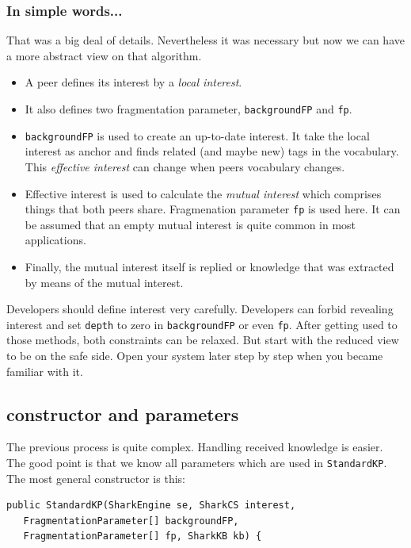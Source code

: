 {\subsubsection{In simple words...}
That was a big deal of details. Nevertheless it was necessary but now we can have a more abstract view on that algorithm.

\begin{itemize}
\item
A peer defines its interest by a {\it local interest}.
\item
It also defines two fragmentation parameter, {\tt backgroundFP} and {\tt fp}.

\item
{\tt backgroundFP} is used to create an up-to-date interest. It take the local interest as anchor and finds related (and maybe new) tags in the vocabulary. This {\it effective interest} can change when peers vocabulary changes.

\item
Effective interest is used to calculate the {\it mutual interest} which comprises things that both peers share. Fragmenation parameter {\tt fp} is used here. It can be assumed that an empty mutual interest is quite common in most applications.

\item
Finally, the mutual interest itself is replied or knowledge that was extracted by means of the mutual interest.
\end{itemize}

Developers should define interest very carefully. Developers can forbid revealing interest and set {\tt depth} to zero in {\tt backgroundFP} or even {\tt fp}. After getting used to those methods, both constraints can be relaxed. But start with the reduced view to be on the safe side. Open your system later step by step when you became familiar with it.

\subsection{constructor and parameters}
The previous process is quite complex. Handling received knowledge is easier. The good point is that we know all parameters which are used in {\tt StandardKP}. The most general constructor is this:

\begin{verbatim}
public StandardKP(SharkEngine se, SharkCS interest,
   FragmentationParameter[] backgroundFP,
   FragmentationParameter[] fp, SharkKB kb) {
\end{verbatim}

}
